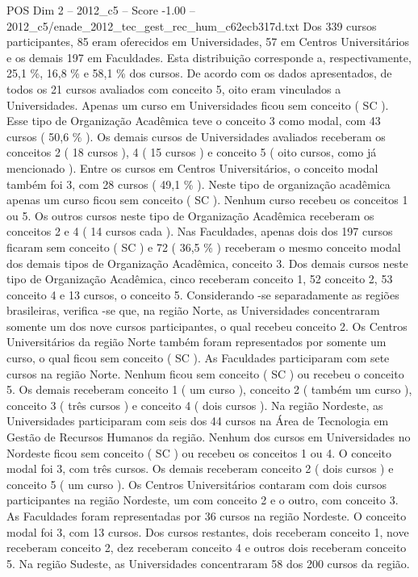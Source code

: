 \begin{textsample}{POS Dim 2 – 2012\_c5 – Score -1.00 – 2012\_c5/enade\_2012\_tec\_gest\_rec\_hum\_c62ecb317d.txt}
Dos 339 cursos participantes, 85 eram oferecidos em Universidades, 57 em Centros Universitários e os demais 197 em Faculdades.
Esta distribuição corresponde a, respectivamente, 25,1 \%, 16,8 \% e 58,1 \% dos cursos.
De acordo com os dados apresentados, de todos os 21 cursos avaliados com conceito 5, oito eram vinculados a Universidades.
Apenas um curso em Universidades ficou sem conceito ( SC ).
Esse tipo de Organização Acadêmica teve o conceito 3 como modal, com 43 cursos ( 50,6 \% ).
Os demais cursos de Universidades avaliados receberam os conceitos 2 ( 18 cursos ), 4 ( 15 cursos ) e conceito 5 ( oito cursos, como já mencionado ).
Entre os cursos em Centros Universitários, o conceito modal também foi 3, com 28 cursos ( 49,1 \% ).
Neste tipo de organização acadêmica apenas um curso ficou sem conceito ( SC ).
Nenhum curso recebeu os conceitos 1 ou 5.
Os outros cursos neste tipo de Organização Acadêmica receberam os conceitos 2 e 4 ( 14 cursos cada ).
Nas Faculdades, apenas dois dos 197 cursos ficaram sem conceito ( SC ) e 72 ( 36,5 \% ) receberam o mesmo conceito modal dos demais tipos de Organização Acadêmica, conceito 3.
Dos demais cursos neste tipo de Organização Acadêmica, cinco receberam conceito 1, 52 conceito 2, 53 conceito 4 e 13 cursos, o conceito 5.
Considerando -se separadamente as regiões brasileiras, verifica -se que, na região Norte, as Universidades concentraram somente um dos nove cursos participantes, o qual recebeu conceito 2.
Os Centros Universitários da região Norte também foram representados por somente um curso, o qual ficou sem conceito ( SC ).
As Faculdades participaram com sete cursos na região Norte.
Nenhum ficou sem conceito ( SC ) ou recebeu o conceito 5.
Os demais receberam conceito 1 ( um curso ), conceito 2 ( também um curso ), conceito 3 ( três cursos ) e conceito 4 ( dois cursos ).
Na região Nordeste, as Universidades participaram com seis dos 44 cursos na Área de Tecnologia em Gestão de Recursos Humanos da região.
Nenhum dos cursos em Universidades no Nordeste ficou sem conceito ( SC ) ou recebeu os conceitos 1 ou 4.
O conceito modal foi 3, com três cursos.
Os demais receberam conceito 2 ( dois cursos ) e conceito 5 ( um curso ).
Os Centros Universitários contaram com dois cursos participantes na região Nordeste, um com conceito 2 e o outro, com conceito 3.
As Faculdades foram representadas por 36 cursos na região Nordeste.
O conceito modal foi 3, com 13 cursos.
Dos cursos restantes, dois receberam conceito 1, nove receberam conceito 2, dez receberam conceito 4 e outros dois receberam conceito 5.
Na região Sudeste, as Universidades concentraram 58 dos 200 cursos da região.

\end{textsample}
